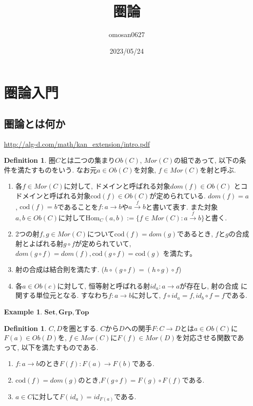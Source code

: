 \documentclass[a4paper,10pt]{article}
\title{圏論}
\author{omosan0627}
\date{2023/05/24}
\theoremstyle{definition}
\newtheorem{definition}[thm]{\bfseries Definition}
\newtheorem{exmp}[thm]{\bfseries Example}
\begin{document}
\maketitle

\section{圏論入門}
\subsection{圏論とは何か}
\url{http://alg-d.com/math/kan_extension/intro.pdf}
\begin{definition}
    圏$C$とは二つの集まり$Ob(C)$, $Mor(C)$の組であって, 以下の条件を満たすものをいう. 
    なお元$a \in Ob(C)$を対象, $f \in Mor(C)$を射と呼ぶ.
    \begin{enumerate}[(1)]
        \item 各$f \in Mor(C)$に対して, ドメインと呼ばれる対象$dom(f)\in Ob(C)$
        とコドメインと呼ばれる対象$\mathrm{cod}(f) \in Ob(C)$が定められている.
        $dom(f) = a$, $\mathrm{cod}(f) = b$であることを$f:a \rightarrow b$や$a \xrightarrow{f} b$と書いて表す.
        また対象$a,b  \in Ob(C)$に対して$\mathrm{Hom}_C(a,b):=\{f \in Mor(C): a \xrightarrow{f} b\}$と書く.
        \item 2つの射$f,g \in Mor(C)$について$\mathrm{cod}(f) = dom(g)$であるとき, 
        $f$と$g$の合成射とよばれる射$g \circ f$が定められていて, $dom(g \circ f)=dom(f), \mathrm{cod}(g \circ f)=\mathrm{cod}(g)$
        を満たす。
        \item 射の合成は結合則を満たす. ($h \circ (g \circ f) = (h \circ g) \circ f$)
        \item 各$a \in Ob(c)$に対して, 恒等射と呼ばれる射$id_{a}:a \rightarrow a$が存在し, 射の合成
        に関する単位元となる. すなわち$f:a \rightarrow b$に対して, $f \circ id_a = f, id_b \circ f = f$である.
    \end{enumerate}
\end{definition}
\begin{exmp}
    $\mathbf{Set}, \mathbf{Grp}, \mathbf{Top}$
\end{exmp}
\begin{definition}
    $C,D$を圏とする. $C$から$D$への関手$F:C \rightarrow D$とは$a \in Ob(C)$に$F(a) \in Ob(D)$を, 
    $f \in Mor(C)$に$F(f) \in Mor(D)$を対応させる関数であって, 以下を満たすものである.
    \begin{enumerate}[(1)]
        \item $f: a \rightarrow b$のとき$F(f): F(a) \rightarrow F(b)$である.
        \item $\mathrm{cod}(f) = dom(g)$のとき,$F(g \circ f)= F(g) \circ F(f)$である.
        \item $a \in C$に対して$F(id_a) = id_{F(a)}$である.
    \end{enumerate}
\end{definition}
\end{document}
